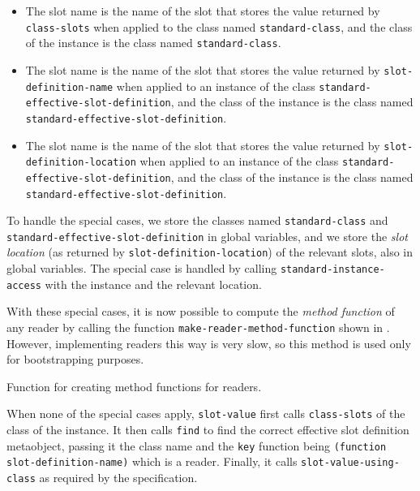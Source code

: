 \begin{itemize}
\item The slot name is the name of the slot that stores the value
  returned by \texttt{class-slots} when applied to the class named
  \texttt{standard-class}, and the class of the instance is the class
  named \texttt{standard-class}.
\item The slot name is the name of the slot that stores the value
  returned by \texttt{slot-definition-name} when applied to an
  instance of the class \texttt{standard-effective-slot-definition},
  and the class of the instance is the class named
  \texttt{standard-effective-slot-definition}. 
\item The slot name is the name of the slot that stores the value
  returned by \texttt{slot-definition-location} when applied to an
  instance of the class \texttt{standard-effective-slot-definition},
  and the class of the instance is the class named
  \texttt{standard-effective-slot-definition}. 
\end{itemize}

To handle the special cases, we store the classes named
\texttt{standard-class} and
\texttt{standard-effective-slot-definition} in global variables, and
we store the \emph{slot location} (as returned by
\texttt{slot-definition-location}) of the relevant slots, also in
global variables.  The special case is handled by calling
\texttt{standard-instance-access} with the instance and the relevant
location.

With these special cases, it is now possible to compute the
\emph{method function} of any reader by calling the function
\texttt{make-reader-method-function} shown in
.  However, implementing readers this way is
very slow, so this method is used only for bootstrapping purposes.

\begin{codefragment}
\caption{\label{code-make-reader}
Function for creating method functions for readers.}
\end{codefragment}

When none of the special cases apply, \texttt{slot-value} first calls
\texttt{class-slots} of the class of the instance.  It then calls
\texttt{find} to find the correct effective slot definition
metaobject, passing it the class name and the \texttt{key} function
being \texttt{(function slot-definition-name)} which is a reader.
Finally, it calls \texttt{slot-value-using-class} as required by the
specification.

